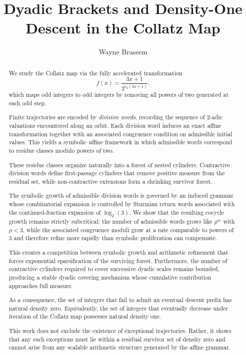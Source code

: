 \documentclass[12pt, oneside]{article}
\title{Dyadic Brackets and Density-One Descent in the Collatz Map}
\author{Wayne Brassem}
\numberwithin{equation}{section}
\theoremstyle{definition}
\theoremstyle{plain}
\theoremstyle{remark}
\begin{document}
\newcommand{\chead}[1]{\multicolumn{1}{c}{#1}}


\maketitle

\begin{abstract}

We study the Collatz map via the fully accelerated transformation
\[
f(x)=\frac{3x+1}{2^{v_2(3x+1)}}.
\]
which maps odd integers to odd integers by removing all powers of two
generated at each odd step.

Finite trajectories are encoded by \emph{division words}, recording
the sequence of 2-adic valuations encountered along an orbit. Each
division word induces an exact affine transformation together with
an associated congruence condition on admissible initial values. This
yields a symbolic--affine framework in which admissible words correspond
to residue classes modulo powers of two.

These residue classes organize naturally into a forest of nested
cylinders.  Contractive division words define first-passage cylinders
that remove positive measure from the residual set, while non-contractive
extensions form a shrinking survivor forest.

The symbolic growth of admissible division words is governed by an
induced grammar whose combinatorial expansion is controlled by Sturmian
return words associated with the continued-fraction expansion of $\log_2(3)$.
We show that the resulting cocycle growth remains strictly subcritical:
the number of admissible words grows like $\rho^m$ with $\rho<3$, while the
associated congruence moduli grow at a rate comparable to powers of $3$ and
therefore refine more rapidly than symbolic proliferation can compensate.

This creates a competition between symbolic growth and arithmetic refinement
that forces exponential sparsification of the surviving forest. Furthermore,
the number of contractive cylinders required to cover successive dyadic
scales remains bounded, producing a stable dyadic covering mechanism whose
cumulative contribution approaches full measure.

As a consequence, the set of integers that fail to admit an eventual
descent prefix has natural density zero. Equivalently, the set of integers
that eventually decrease under iteration of the Collatz map possesses
natural density one.

This work does not exclude the existence of exceptional trajectories. Rather,
it shows that any such exceptions must lie within a residual survivor set of
density zero and cannot arise from any scalable arithmetic structure generated
by the affine grammar.

\end{abstract}
\end{document}
